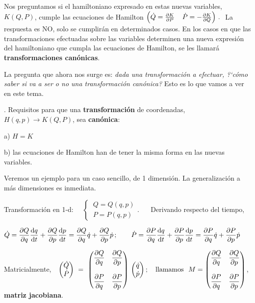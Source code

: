 Nos preguntamos si el hamiltoniano expresado en estas nuevas variables, $K(Q,P)$, cumple las ecuaciones de Hamilton \textcolor{gris}{$\left( \dot Q=\pdv{K}{P}\, \; \ \ \dot P=-\pdv{K}{Q} \right) \, . \ $} La respuesta es NO, solo se cumplirán en determinados casos. En los casos en que las transformaciones efectuadas sobre las variables determinen una nueva expresión del hamiltoniano que cumpla las ecuaciones de Hamilton, se les llamará \textbf{transformaciones canónicas}.


La pregunta que ahora nos surge es: \emph{dada una transformación a efectuar, ?`cómo saber si va a ser o no una transformación canónica?} Esto es lo que vamos a ver en este tema.

\begin{definition}
.	Requisitos para que una \textbf{transformación} de coordenadas, $H(q,p)\to K(Q,P)$, sea \textbf{canónica}:	

\begin{adjustwidth}{20pt}{20pt}
a) \hspace{5mm} $H=K$

b) \hspace{5mm} las ecuaciones de Hamilton han de tener la misma forma en las nuevas variables.	
\end{adjustwidth}
\end{definition}

Veremos un ejemplo para un caso sencillo, de 1 dimensión. La generalización a más dimensiones es inmediata.

Transformación en 1-d: $\quad \begin{cases} \ Q=Q(q,p) \\ \ P=P(q,p) \end{cases}$. $\quad$ Derivando respecto del tiempo,

$\displaystyle \dot Q = \pdv{Q}{q} \dv{q}{t} + \pdv{Q}{p}\dv{p}{t}=\pdv{Q}{q} \dot q + \pdv{Q}{p}\dot p\, ; \qquad 
\dot P = \pdv{P}{q} \dv{q}{t} + \pdv{P}{p}\dv{p}{t}=\pdv{P}{q} \dot q + \pdv{P}{p}\dot p$


Matricialmente, $\  \ \mqty(\dot Q \\ \dot P) \ = \ \mqty( \displaystyle \pdv{Q}{q} & \displaystyle \pdv{Q}{p} \\ \\ \displaystyle \pdv{P}{q} & \displaystyle \pdv{P}{p} ) \ \mqty(\dot q\\ \dot p)\, ; \quad \text{llamamos } \ M=\mqty( \displaystyle \pdv{Q}{q} & \displaystyle \pdv{Q}{p} \\ \\ \displaystyle \pdv{P}{q} & \displaystyle \pdv{P}{p} )$, \textbf{matriz jacobiana}.

